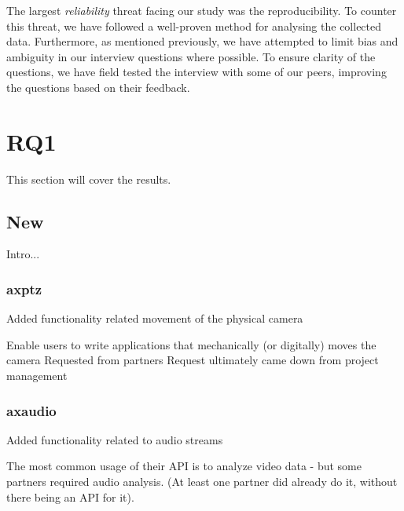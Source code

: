 \documentclass[conference]{IEEEtran}
\begin{document}
The largest \textit{reliability} threat facing our study was the reproducibility. To counter this threat, we have followed a well-proven method for analysing the collected data. Furthermore, as mentioned previously, we have attempted to limit bias and ambiguity in our interview questions where possible. To ensure clarity of the questions, we have field tested the interview with some of our peers, improving the questions based on their feedback.


 \newpage
\section{RQ1} \label{results}
This section will cover the results.


\subsection{New}
Intro...

\subsubsection{axptz}

Added functionality related movement of the physical camera



Enable users to write applications that mechanically (or digitally) moves the camera
Requested from partners
Request ultimately came down from project management










\subsubsection{axaudio}

Added functionality related to audio streams



The most common usage of their API is to analyze video data - but some partners required audio analysis. (At least one partner did already do it, without there being an API for it).




\end{document}

